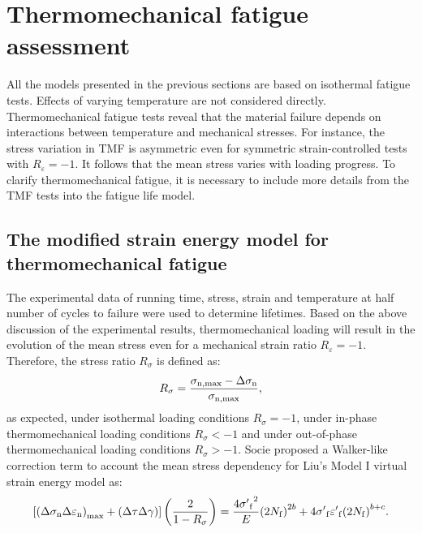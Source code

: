 \section{Thermomechanical fatigue assessment}
\noindent
All the models presented in the previous sections are based on isothermal fatigue tests. Effects of varying temperature are not considered directly. Thermomechanical fatigue tests reveal that the material failure depends on interactions between temperature and mechanical stresses. For instance, the stress variation in TMF is asymmetric even for symmetric strain-controlled tests with $R_{\varepsilon}=-1$. It follows that the mean stress varies with loading progress. To clarify thermomechanical fatigue, it is necessary to include more details from the TMF tests into the fatigue life model.

\subsection{The modified strain energy model for thermomechanical fatigue}
\noindent
The experimental data of running time, stress, strain and temperature at half number of cycles to failure were used to determine lifetimes.
Based on the above discussion of the experimental results, thermomechanical loading  will result in the evolution of the mean stress even for a mechanical strain ratio $R_{\varepsilon}=-1$. Therefore, the stress ratio ${R_\sigma }$ is defined as:
\begin{equation}
{R_\sigma } = \frac{{{\sigma _{\rm n,\max }} - \Delta {\sigma _{\rm n}}}}{{{\sigma _{\rm n,\max }}}},
\end{equation}
as expected, under isothermal loading conditions ${R_\sigma }=-1$, under in-phase thermomechanical loading conditions ${R_\sigma }<-1$ and under out-of-phase thermomechanical loading conditions ${R_\sigma }>-1$.
Socie \cite{Socie2000} proposed a Walker-like correction term \cite{Walker1970} to account the mean stress dependency for Liu's Model I virtual strain energy model as:
\begin{equation}
\left[ {{{\left( {\Delta {\sigma _{\rm n}}\Delta {\varepsilon _{\rm n}}} \right)}_{\max }} + \left( {\Delta \tau \Delta \gamma } \right)} \right]\left( {\frac{2}{{1 - {R_\sigma }}}} \right)
= \frac{{4{{\sigma '}_{\rm f}}^2}}{E}{\left( {2{N_{\rm f}}} \right)^{2b}} + 4{{\sigma '}_{\rm f}}{{\varepsilon '}_{\rm f}}{\left( {2{N_{\rm f}}} \right)^{b + c}}.
\label{Equ:LiuModelwithStressRatio}
\end{equation}

